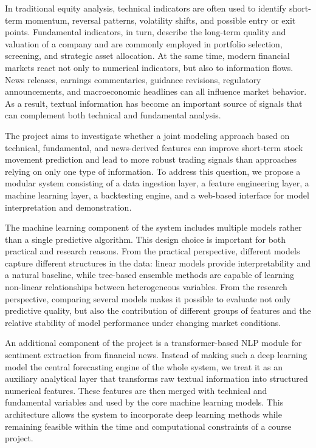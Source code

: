 \documentclass[12pt,a4paper]{article}
\begin{document}
In traditional equity analysis, technical indicators are often used to identify short-term momentum, reversal patterns, volatility shifts, and possible entry or exit points. Fundamental indicators, in turn, describe the long-term quality and valuation of a company and are commonly employed in portfolio selection, screening, and strategic asset allocation. At the same time, modern financial markets react not only to numerical indicators, but also to information flows. News releases, earnings commentaries, guidance revisions, regulatory announcements, and macroeconomic headlines can all influence market behavior. As a result, textual information has become an important source of signals that can complement both technical and fundamental analysis.

The project aims to investigate whether a joint modeling approach based on technical, fundamental, and news-derived features can improve short-term stock movement prediction and lead to more robust trading signals than approaches relying on only one type of information. To address this question, we propose a modular system consisting of a data ingestion layer, a feature engineering layer, a machine learning layer, a backtesting engine, and a web-based interface for model interpretation and demonstration.

The machine learning component of the system includes multiple models rather than a single predictive algorithm. This design choice is important for both practical and research reasons. From the practical perspective, different models capture different structures in the data: linear models provide interpretability and a natural baseline, while tree-based ensemble methods are capable of learning non-linear relationships between heterogeneous variables. From the research perspective, comparing several models makes it possible to evaluate not only predictive quality, but also the contribution of different groups of features and the relative stability of model performance under changing market conditions.

An additional component of the project is a transformer-based NLP module for sentiment extraction from financial news. Instead of making such a deep learning model the central forecasting engine of the whole system, we treat it as an auxiliary analytical layer that transforms raw textual information into structured numerical features. These features are then merged with technical and fundamental variables and used by the core machine learning models. This architecture allows the system to incorporate deep learning methods while remaining feasible within the time and computational constraints of a course project.
\end{document}
